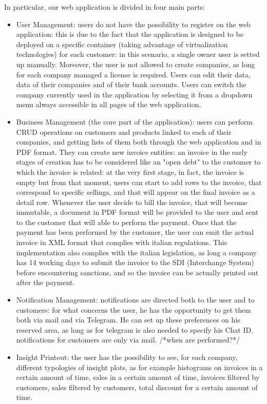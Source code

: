 In particular, our web application is divided in four main parts:
\begin{itemize}
    \item User Management: users do not have the possibility to register on the web application: this is due to the fact that the application is designed to be deployed on a specific container (taking advantage of virtualization technologies) for each customer: in this scenario, a single owner user is setted up manually. Moreover, the user is not allowed to create companies, as long for each company managed a license is required. Users can edit their data, data of their companies and of their bank accounts. Users can switch the company currently used in the application by selecting it from a dropdown menu always accessible in all pages of the web application.
    \item Business Management (the core part of the application): users can perform CRUD operations on customers and products linked to each of their companies, and getting lists of them both through the web application and in PDF format. They can create new invoice entities: an invoice in the early stages of creation has to be considered like an "open debt" to the customer to which the invoice is related: at the very first stage, in fact, the invoice is empty but from that moment, users can start to add rows to the invoice, that correspond to specific sellings, and that will appear on the final invoice as a detail row. Whenever the user decide to bill the invoice, that will become immutable, a document in PDF format will be provided to the user and sent to the customer that will able to perform the payment. Once that the payment has been performed by the customer, the user can emit the actual invoice in XML format that complies with italian regulations. This implementation also complies with the italian legislation, as long a company has 14 working days to submit the invoice to the SDI (Interchange System) before encountering sanctions, and so the invoice can be actually printed out after the payment.
    \item Notification Management: notifications are directed both to the user and to customers: for what concerns the user, he has the opportunity to get them both via mail and via Telegram. He can set up these preferences on his reserved area, as long as for telegram is also needed to specify his Chat ID. notifications for customers are only via mail. /*when are performed?*/
    \item Insight Printout: the user has the possibility to see, for each company, different typologies of insight plots, as for example histograms on invoices in a certain amount of time, sales in a certain amount of time, invoices filtered by customers, sales filtered by customers, total discount for a certain amount of time.
\end{itemize}

